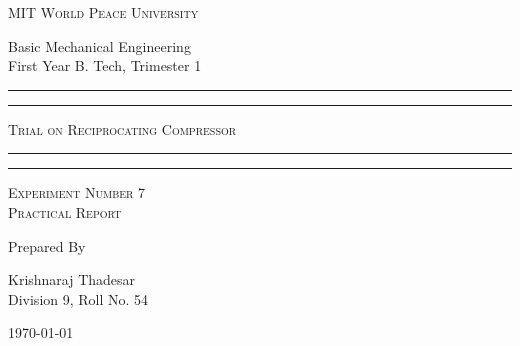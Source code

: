 \documentclass[11pt]{article}
\begin{document}
	
	\begin{titlepage} 
		\centering 
		
		
		\huge\textsc{
			MIT World Peace University
		}\\
	
		\vspace{0.75\baselineskip} %
		
		\LARGE{
			Basic Mechanical Engineering\\
			First Year B. Tech, Trimester 1
		}
		
		\vfill %
		
		
		\rule{\textwidth}{1.6pt}\vspace*{-\baselineskip}\vspace*{2pt}
		\rule{\textwidth}{0.6pt}
		\vspace{0.4\baselineskip} %
		
		
		
		\huge{\textsc{
				Trial on Reciprocating Compressor
			}} \\
		
		
		
		\vspace{0.5\baselineskip} %
		\rule{\textwidth}{0.6pt}\vspace*{-\baselineskip}\vspace*{2.8pt}
		\rule{\textwidth}{1.6pt}
		
		\vspace{1\baselineskip} %

			
		\LARGE\textsc{
			Experiment Number 7\\Practical Report
		} %
		\vfill
		
		
		Prepared By
		\vspace{0.5\baselineskip} %
		
		\Large{
			Krishnaraj Thadesar \\
			Division 9, Roll No. 54
		}
		
		
		\vspace{0.5\baselineskip} %
		\today

	\end{titlepage}
	
\end{document}
